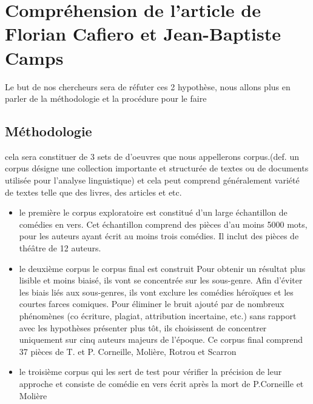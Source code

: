\documentclass[]{report}
\begin{document}
\section{Compréhension de l'article de Florian Cafiero et Jean-Baptiste Camps}
\hspace{0,5 cm} Le but de nos chercheurs sera de réfuter ces 2 hypothèse, nous
allons plus en parler de la méthodologie et la procédure pour le faire

\subsection{Méthodologie}
\vspace{\baselineskip}
\hspace{0,5cm} cela sera constituer de 3 sets de d'oeuvres que nous appellerons
corpus.(def. un corpus désigne une collection importante et structurée de textes
ou de documents utilisée pour l'analyse linguistique) et cela peut comprend
généralement variété de textes telle que des livres, des articles et etc.  
\begin{itemize}
\item   le première le corpus exploratoire est constitué d'un large échantillon
de comédies en vers. Cet échantillon comprend des pièces d'au moins 5000 mots,
pour les auteurs ayant écrit au moins trois comédies. Il inclut des pièces de
théâtre de 12 auteurs.
	
\item   le deuxième corpus  le corpus final est construit  Pour obtenir un
résultat plus lisible et moins biaisé, ils vont se concentrée sur les
sous-genre. Afin d'éviter les biais liés aux sous-genres, ils vont exclure les
comédies héroïques et les courtes farces comiques. Pour éliminer le bruit ajouté
par de nombreux phénomènes (co écriture, plagiat, attribution incertaine, etc.)
sans rapport avec les hypothèses présenter plus tôt, ils choisissent de
concentrer uniquement sur cinq auteurs majeurs de l'époque. Ce corpus final
comprend 37 pièces de T. et P. Corneille, Molière, Rotrou et Scarron
	
\item le troisième corpus qui les sert de test pour vérifier la précision de
leur approche et consiste de comédie en vers écrit après la mort de P.Corneille
et Molière	
\end{itemize}
\end{document}
